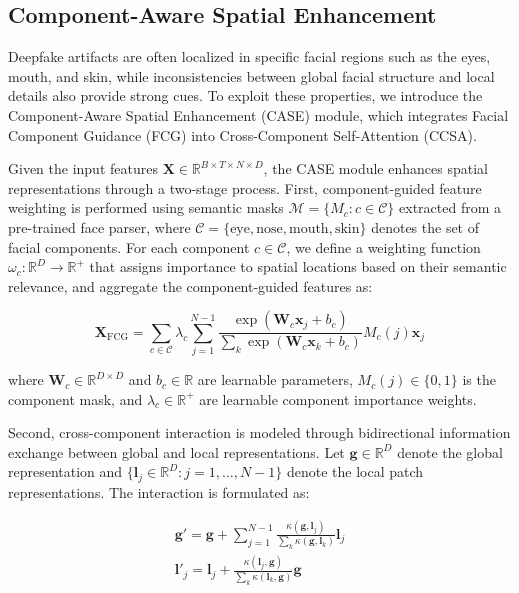 \subsection{Component-Aware Spatial Enhancement}

Deepfake artifacts are often localized in specific facial regions such as the eyes, mouth, and skin, while inconsistencies between global facial structure and local details also provide strong cues. To exploit these properties, we introduce the Component-Aware Spatial Enhancement (CASE) module, which integrates Facial Component Guidance (FCG) into Cross-Component Self-Attention (CCSA).

Given the input features $\mathbf{X} \in \mathbb{R}^{B \times T \times N \times D}$, the CASE module enhances spatial representations through a two-stage process. First, component-guided feature weighting is performed using semantic masks $\mathcal{M} = \{M_c : c \in \mathcal{C}\}$ extracted from a pre-trained face parser, where $\mathcal{C} = \{\text{eye}, \text{nose}, \text{mouth}, \text{skin}\}$ denotes the set of facial components. For each component $c \in \mathcal{C}$, we define a weighting function $\omega_c: \mathbb{R}^D \rightarrow \mathbb{R}^+$ that assigns importance to spatial locations based on their semantic relevance, and aggregate the component-guided features as:

\begin{equation}
\mathbf{X}_{\text{FCG}} = \sum_{c \in \mathcal{C}} \lambda_c \sum_{j=1}^{N-1} \frac{\exp(\mathbf{W}_c \mathbf{x}_j + b_c)}{\sum_k \exp(\mathbf{W}_c \mathbf{x}_k + b_c)} M_c(j) \mathbf{x}_j
\end{equation}

where $\mathbf{W}_c \in \mathbb{R}^{D \times D}$ and $b_c \in \mathbb{R}$ are learnable parameters, $M_c(j) \in \{0,1\}$ is the component mask, and $\lambda_c \in \mathbb{R}^+$ are learnable component importance weights.

Second, cross-component interaction is modeled through bidirectional information exchange between global and local representations. Let $\mathbf{g} \in \mathbb{R}^D$ denote the global representation and $\{\mathbf{l}_j \in \mathbb{R}^D : j = 1, \ldots, N-1\}$ denote the local patch representations. The interaction is formulated as:

\begin{equation}
\begin{split}
\mathbf{g}' = \mathbf{g} + \sum_{j=1}^{N-1} \frac{\kappa(\mathbf{g}, \mathbf{l}_j)}{\sum_k \kappa(\mathbf{g}, \mathbf{l}_k)} \mathbf{l}_j \\
\mathbf{l}'_j = \mathbf{l}_j + \frac{\kappa(\mathbf{l}_j, \mathbf{g})}{\sum_k \kappa(\mathbf{l}_k, \mathbf{g})} \mathbf{g}
\end{split}
\end{equation}

